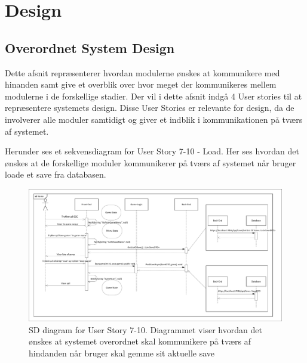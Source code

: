\section{Design}


\subsection{Overordnet System Design}
\noindent Dette afsnit repræsenterer hvordan modulerne ønskes at kommunikere med hinanden samt give et overblik over hvor meget der kommunikeres mellem modulerne i de forskellige stadier. Der vil i dette afsnit indgå 4 User stories til at repræsentere systemets design. Disse User Stories er relevante for design, da de involverer alle moduler samtidigt og giver et indblik i kommunikationen på tværs af systemet.

\noindent Herunder ses et sekvensdiagram for User Story 7-10 - Load. Her ses hvordan det ønskes at de forskellige moduler kommunikerer på tværs af systemet når bruger loade et save fra databasen.
\begin{figure}[H]
\centering
\includegraphics[width = \textwidth]{02-Body/Images/Arkitektur - SD Save Game}
\caption{SD diagram for User Story 7-10. Diagrammet viser hvordan det ønskes at systemet overordnet skal kommunikere på tværs af hindanden når bruger skal gemme sit aktuelle save}
\label{fig:Arkitektur-SD-SaveGame}
\end{figure}

